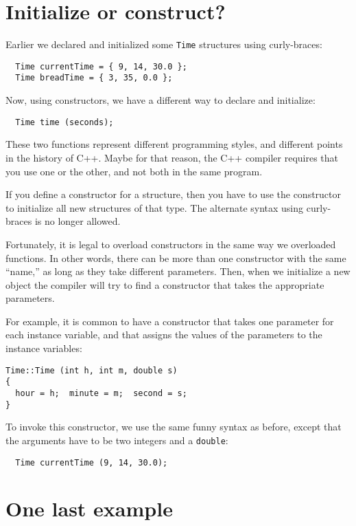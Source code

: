 \section {Initialize or construct?}

Earlier we declared and initialized some {\tt Time} structures
using curly-braces:

\begin{verbatim}
  Time currentTime = { 9, 14, 30.0 };
  Time breadTime = { 3, 35, 0.0 };
\end{verbatim}
%
Now, using constructors, we have a different way to declare
and initialize:

\begin{verbatim}
  Time time (seconds);
\end{verbatim}
%
These two functions represent different programming styles, and
different points in the history of C++.  Maybe
for that reason, the C++ compiler requires that you use one or
the other, and not both in the same program.

If you define a constructor for a structure, then you have to
use the constructor to initialize all new structures of that
type.  The alternate syntax using curly-braces is no longer
allowed.

Fortunately, it is legal to overload constructors in the same
way we overloaded functions.  In other words, there can be more
than one constructor with the same ``name,'' as long as they
take different parameters.  Then, when we initialize a new object
the compiler will try to find a constructor that takes the
appropriate parameters.

For example, it is common to have a constructor that takes
one parameter for each instance variable, and that assigns
the values of the parameters to the instance variables:

\begin{verbatim}
Time::Time (int h, int m, double s)
{
  hour = h;  minute = m;  second = s;
}
\end{verbatim}
%
To invoke this constructor, we use the same funny syntax
as before, except that the arguments have to be two integers
and a {\tt double}:

\begin{verbatim}
  Time currentTime (9, 14, 30.0);
\end{verbatim}

\section {One last example}

